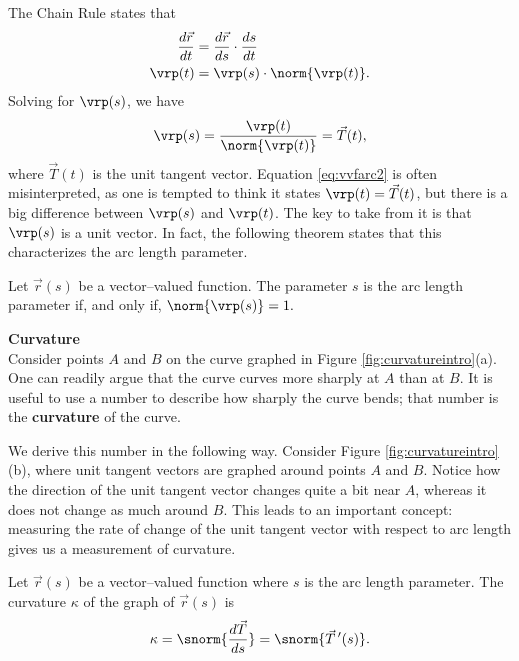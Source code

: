 The Chain Rule states that 
\begin{align*}
\frac{d\vec r}{dt} &= \frac{d\vec r}{ds}\cdot\frac{ds}{dt}\\
\vrp(t) &= \vrp(s)\cdot \norm{\vrp(t)}.
\end{align*}
Solving for $\vrp(s)$, we have 
\begin{equation}
\vrp(s) = \frac{\vrp(t)}{\norm{\vrp(t)}} = \vec T(t),\label{eq:vvfarc2}
\end{equation}
where $\vec T(t)$ is the unit tangent vector. Equation \ref{eq:vvfarc2} is often misinterpreted, as one is tempted to think it states $\vrp(t) = \vec T(t)$, but there is a big difference between $\vrp(s)$ and $\vrp(t)$. The key to take from it is that $\vrp(s)$ is a unit vector. In fact, the following theorem states that this characterizes the arc length parameter.

{Let $\vec r(s)$ be a vector--valued function. The parameter $s$ is the arc length parameter if, and only if, $\norm{\vrp(s)} = 1.$
}

\noindent\textbf{\large Curvature}\\

Consider points $A$ and $B$ on the curve graphed in Figure \ref{fig:curvatureintro}(a). One can readily argue that the curve curves more sharply at $A$ than at $B$. It is useful to use a number to describe how sharply the curve bends; that number is the \textbf{curvature} of the curve.

We derive this number in the following way. Consider Figure \ref{fig:curvatureintro}(b), where  unit tangent vectors are graphed around points $A$ and $B$. Notice how the direction of the unit tangent vector changes quite a bit near $A$, whereas it does not change as much around $B$. This leads to an important concept: measuring the rate of change of the unit tangent vector with respect to arc length gives us a measurement of curvature.

{Let $\vec r(s)$ be a vector--valued function where $s$ is the arc length parameter. The curvature $\kappa$ of the graph of $\vec r(s)$ is
\[
\kappa = \snorm{\frac{d\vec T}{ds}} = \snorm{\vec T\,'(s)}.
\]
}\\

